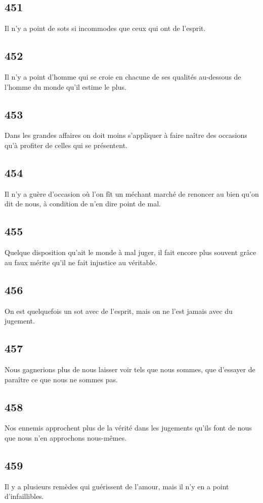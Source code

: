 \documentclass[french,twoside]{book} %
\begin{document}
\subsection[{451}]{ \textsc{451} }
\noindent Il n’y a point de sots si incommodes que ceux qui ont de l’esprit.
\subsection[{452}]{ \textsc{452} }
\noindent Il n’y a point d’homme qui se croie en chacune de ses qualités au-dessous de l’homme du monde qu’il estime le plus.
\subsection[{453}]{ \textsc{453} }
\noindent Dans les grandes affaires on doit moins s’appliquer à faire naître des occasions qu’à profiter de celles qui se présentent.
\subsection[{454}]{ \textsc{454} }
\noindent Il n’y a guère d’occasion où l’on fît un méchant marché de renoncer au bien qu’on dit de nous, à condition de n’en dire point de mal.
\subsection[{455}]{ \textsc{455} }
\noindent Quelque disposition qu’ait le monde à mal juger, il fait encore plus souvent grâce au faux mérite qu’il ne fait injustice au véritable.
\subsection[{456}]{ \textsc{456} }
\noindent On est quelquefois un sot avec de l’esprit, mais on ne l’est jamais avec du jugement.
\subsection[{457}]{ \textsc{457} }
\noindent Nous gagnerions plus de nous laisser voir tels que nous sommes, que d’essayer de paraître ce que nous ne sommes pas.
\subsection[{458}]{ \textsc{458} }
\noindent Nos ennemis approchent plus de la vérité dans les jugements qu’ils font de nous que nous n’en approchons nous-mêmes.
\subsection[{459}]{ \textsc{459} }
\noindent Il y a plusieurs remèdes qui guérissent de l’amour, mais il n’y en a point d’infaillibles.
\end{document}
